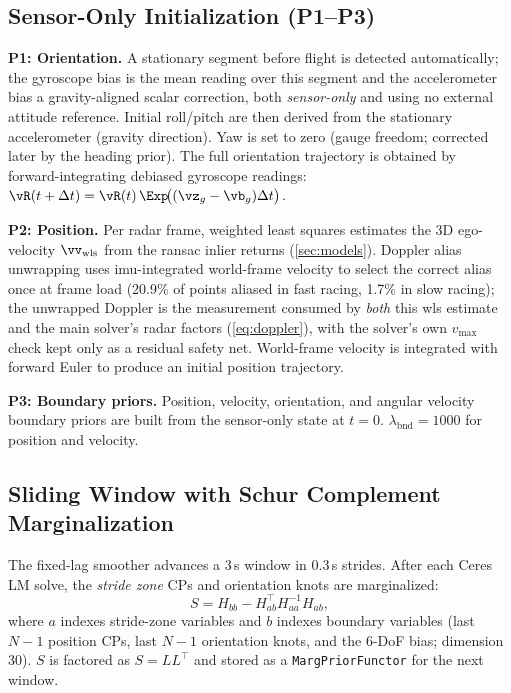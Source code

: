 \subsection{Sensor-Only Initialization (P1--P3)}
\label{sec:init}

\textbf{P1: Orientation.}
A stationary segment before flight is detected automatically; the gyroscope
bias is the mean reading over this segment and the accelerometer bias a
gravity-aligned scalar correction, both \emph{sensor-only} and using no
external attitude reference.
Initial roll/pitch are then derived from the stationary accelerometer
(gravity direction).  Yaw is set to zero (gauge freedom; corrected
later by the heading prior).  The full orientation trajectory is
obtained by forward-integrating debiased gyroscope readings:
$\vR(t+\Delta t) = \vR(t)\,\Exp\!\bigl((\vz_g - \vb_g)\Delta t\bigr)$.

\textbf{P2: Position.}
Per radar frame, weighted least squares estimates the 3D ego-velocity
$\vv_{\text{wls}}$ from the \ac{ransac} inlier returns
(\autoref{sec:models}).  Doppler alias
unwrapping uses \ac{imu}-integrated world-frame velocity to select the
correct alias once at frame load (20.9\% of points aliased
in fast racing, 1.7\% in slow racing); the unwrapped Doppler is the
measurement consumed by \emph{both} this \ac{wls} estimate and the main
solver's radar factors (\autoref{eq:doppler}), with the solver's own
$v_{\max}$ check kept only as a residual safety net.
World-frame velocity is integrated with forward Euler to produce an
initial position trajectory.

\textbf{P3: Boundary priors.}
Position, velocity, orientation, and angular velocity boundary
priors are built from the sensor-only state at $t=0$.
$\lambda_{\text{bnd}} = 1000$ for position and velocity.

\subsection{Sliding Window with Schur Complement Marginalization}
\label{sec:sw}

The fixed-lag smoother advances a 3\,s window in 0.3\,s strides.
After each Ceres LM solve, the \emph{stride zone} CPs and orientation
knots are marginalized:
\begin{equation}
  S = H_{bb} - H_{ab}^{\top} H_{aa}^{-1} H_{ab},
  \label{eq:schur}
\end{equation}
where $a$ indexes stride-zone variables and $b$ indexes boundary
variables (last $N{-}1$ position CPs, last $N{-}1$ orientation
knots, and the 6-DoF bias; dimension 30).  $S$ is factored as
$S = LL^{\top}$ and stored as a \texttt{MargPriorFunctor} for the
next window.

